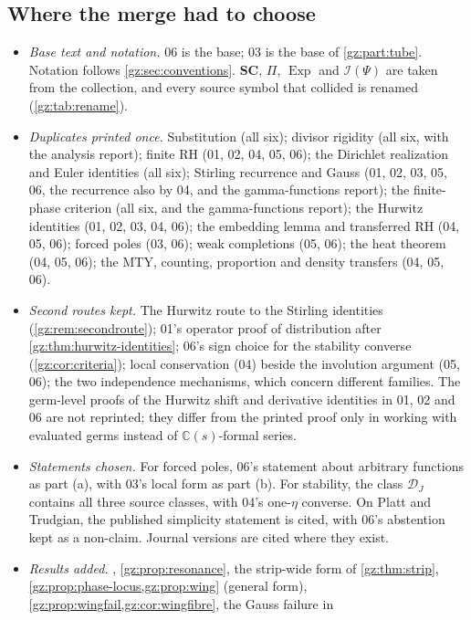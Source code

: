 \documentclass[11pt,a4paper]{article}
\numberwithin{equation}{section}
\theoremstyle{definition}
\theoremstyle{remark}
\newcommand{\SC}{\mathbf{SC}}
\newcommand{\C}{\mathbb C}
\newcommand{\Exp}{\operatorname{Exp}}
\newcommand{\cI}{\mathcal I}
\newcommand{\DJs}{\mathcal D_{J}}
\begin{document}
\subsection{Where the merge had to choose}
\begin{itemize}
\item \emph{Base text and notation.} 06 is the base; 03 is the base of
 \cref{gz:part:tube}. Notation follows \cref{gz:sec:conventions}. $\SC$,
 $\Pi$, $\Exp$ and $\cI(\Psi)$ are taken from the collection, and every
 source symbol that collided is renamed (\cref{gz:tab:rename}).
\item \emph{Duplicates printed once.} Substitution (all six); divisor rigidity
 (all six, with the analysis report); finite RH (01, 02, 04, 05, 06); the
 Dirichlet realization and Euler identities (all six); Stirling recurrence
 and Gauss (01, 02, 03, 05, 06, the recurrence also by 04, and the
 gamma-functions report); the
 finite-phase criterion (all six, and the gamma-functions report); the
 Hurwitz identities (01, 02, 03, 04, 06); the embedding lemma and transferred
 RH (04, 05, 06); forced poles (03, 06); weak completions (05, 06); the heat
 theorem (04, 05, 06); the MTY, counting, proportion and density transfers
 (04, 05, 06).
\item \emph{Second routes kept.} The Hurwitz route to the Stirling identities
 (\cref{gz:rem:secondroute}); 01's operator proof of distribution after
 \cref{gz:thm:hurwitz-identities}; 06's sign choice for the stability
 converse (\cref{gz:cor:criteria}); local conservation (04) beside the
 involution argument (05, 06); the two independence mechanisms, which concern
 different families. The germ-level proofs of the Hurwitz shift and
 derivative identities in 01, 02 and 06 are not reprinted; they differ from
 the printed proof only in working with evaluated germs instead of
 $\C(s)$-formal series.
\item \emph{Statements chosen.} For forced poles, 06's statement about arbitrary
 functions as part (a), with 03's local form as part (b). For stability, the class $\DJs$
 contains all three source classes, with 04's one-$\eta$ converse. On Platt
 and Trudgian, the published simplicity statement is cited, with 06's
 abstention kept as a non-claim. Journal versions are cited where they exist.
\item \emph{Results added.} ,
 \cref{gz:prop:resonance}, the strip-wide form of \cref{gz:thm:strip},
 \cref{gz:prop:phase-locus,gz:prop:wing} (general form),
 \cref{gz:prop:wingfail,gz:cor:wingfibre}, the Gauss failure in

\end{itemize}
\end{document}
